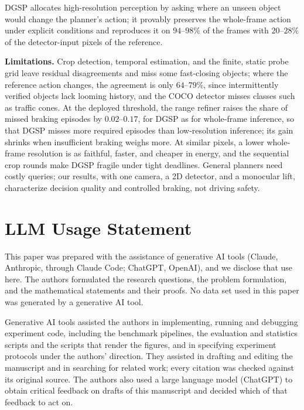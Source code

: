 \documentclass[10pt,twocolumn,letterpaper]{article}
\newcommand{\method}{DGSP\xspace}
\theoremstyle{definition}
\theoremstyle{remark}
\begin{document}
\method allocates high-resolution perception by asking where an unseen object would change the planner's action; it provably preserves the whole-frame action under explicit conditions and reproduces it on $94$--$98\%$ of the frames with $20$--$28\%$ of the detector-input pixels of the reference.

\noindent\textbf{Limitations.}
Crop detection, temporal estimation, and the finite, static probe grid leave residual disagreements and miss some fast-closing objects; where the reference action changes, the agreement is only $64$--$79\%$, since intermittently verified objects lack looming history, and the COCO detector misses classes such as traffic cones.
At the deployed threshold, the range refiner raises the share of missed braking episodes by $0.02$--$0.17$, for \method as for whole-frame inference, so that \method misses more required episodes than low-resolution inference; its gain shrinks when insufficient braking weighs more.
At similar pixels, a lower whole-frame resolution is as faithful, faster, and cheaper in energy, and the sequential crop rounds make \method fragile under tight deadlines.
General planners need costly queries; our results, with one camera, a 2D detector, and a monocular lift, characterize decision quality and controlled braking, not driving safety.



\clearpage
\section*{LLM Usage Statement}
This paper was prepared with the assistance of generative AI tools (Claude, Anthropic, through Claude Code; ChatGPT, OpenAI), and we disclose that use here.
The authors formulated the research questions, the problem formulation, and the mathematical statements and their proofs.
No data set used in this paper was generated by a generative AI tool.

Generative AI tools assisted the authors in implementing, running and debugging experiment code, including the benchmark pipelines, the evaluation and statistics scripts and the scripts that render the figures, and in specifying experiment protocols under the authors' direction.
They assisted in drafting and editing the manuscript and in searching for related work; every citation was checked against its original source.
The authors also used a large language model (ChatGPT) to obtain critical feedback on drafts of this manuscript and decided which of that feedback to act on.
\end{document}
